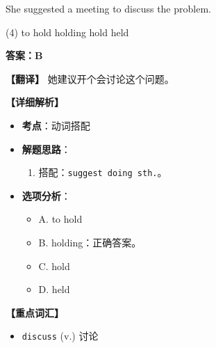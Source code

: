 \documentclass[11pt, a4paper]{article}
\newcommand{\analysis}[4]{
    \begin{solutionbox}
        \textbf{答案：#1}
        
        \textbf{【翻译】} #2
        
        \textbf{【详细解析】}
        #3
        
        \textbf{【重点词汇】}
        #4
    \end{solutionbox}
}
\newcommand{\blank}{\underline{\hspace{1.5cm}}}
\begin{document}
\begin{questions}
    \item She suggested \blank a meeting to discuss the problem.
    \begin{tasks}(4)
        \task to hold \task holding \task hold \task held
    \end{tasks}
    \analysis{B}{她建议开个会讨论这个问题。}{
        \begin{itemize}
            \item \textbf{考点}：动词搭配
            \item \textbf{解题思路}：
                \begin{enumerate}
                    \item 搭配：\texttt{suggest doing sth.}。
                \end{enumerate}
            \item \textbf{选项分析}：
                \begin{itemize}
                    \item A. to hold
                    \item B. holding：正确答案。
                    \item C. hold
                    \item D. held
                \end{itemize}
        \end{itemize}
    }{
        \begin{itemize}
            \item \texttt{discuss} (v.) 讨论
        \end{itemize}
    }


\end{questions}
\end{document}
